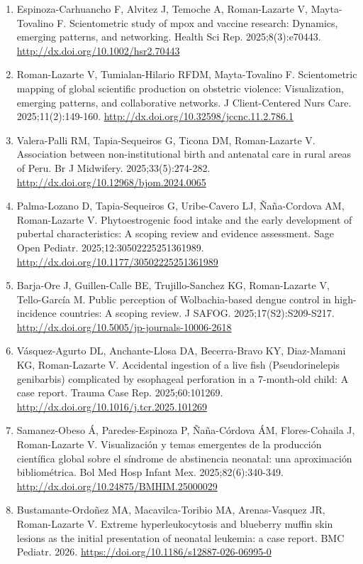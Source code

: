 \documentclass[11pt,a4paper]{article}
\begin{document}
\begin{enumerate}[leftmargin=*]
\item Espinoza-Carhuancho F, Alvitez J, Temoche A, Roman-Lazarte V, Mayta-Tovalino F. Scientometric study of mpox and vaccine research: Dynamics, emerging patterns, and networking. Health Sci Rep. 2025;8(3):e70443. \url{http://dx.doi.org/10.1002/hsr2.70443}
\item Roman-Lazarte V, Tumialan-Hilario RFDM, Mayta-Tovalino F. Scientometric mapping of global scientific production on obstetric violence: Visualization, emerging patterns, and collaborative networks. J Client-Centered Nurs Care. 2025;11(2):149-160. \url{http://dx.doi.org/10.32598/jccnc.11.2.786.1}
\item Valera-Palli RM, Tapia-Sequeiros G, Ticona DM, Roman-Lazarte V. Association between non-institutional birth and antenatal care in rural areas of Peru. Br J Midwifery. 2025;33(5):274-282. \url{http://dx.doi.org/10.12968/bjom.2024.0065}
\item Palma-Lozano D, Tapia-Sequeiros G, Uribe-Cavero LJ, Ñaña-Cordova AM, Roman-Lazarte V. Phytoestrogenic food intake and the early development of pubertal characteristics: A scoping review and evidence assessment. Sage Open Pediatr. 2025;12:30502225251361989. \url{http://dx.doi.org/10.1177/30502225251361989}
\item Barja-Ore J, Guillen-Calle BE, Trujillo-Sanchez KG, Roman-Lazarte V, Tello-García M. Public perception of Wolbachia-based dengue control in high-incidence countries: A scoping review. J SAFOG. 2025;17(S2):S209-S217. \url{http://dx.doi.org/10.5005/jp-journals-10006-2618}
\item Vásquez-Agurto DL, Anchante-Llosa DA, Becerra-Bravo KY, Diaz-Mamani KG, Roman-Lazarte V. Accidental ingestion of a live fish (Pseudorinelepis genibarbis) complicated by esophageal perforation in a 7-month-old child: A case report. Trauma Case Rep. 2025;60:101269. \url{http://dx.doi.org/10.1016/j.tcr.2025.101269}
\item Samanez-Obeso Á, Paredes-Espinoza P, Ñaña-Córdova ÁM, Flores-Cohaila J, Roman-Lazarte V. Visualización y temas emergentes de la producción científica global sobre el síndrome de abstinencia neonatal: una aproximación bibliométrica. Bol Med Hosp Infant Mex. 2025;82(6):340-349. \url{http://dx.doi.org/10.24875/BMHIM.25000029}
\item Bustamante-Ordoñez MA, Macavilca-Toribio MA, Arenas-Vasquez JR, Roman-Lazarte V. Extreme hyperleukocytosis and blueberry muffin skin lesions as the initial presentation of neonatal leukemia: a case report. BMC Pediatr. 2026. \url{https://doi.org/10.1186/s12887-026-06995-0}

\end{enumerate}
\end{document}
